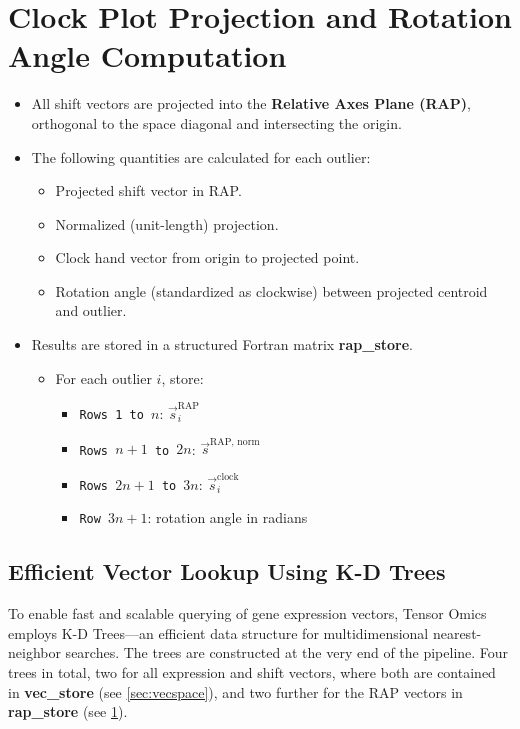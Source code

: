 \documentclass{article}
\begin{document}
\section{Clock Plot Projection and Rotation Angle Computation}
\label{sec:rap}
\begin{itemize}
    \item All shift vectors are projected into the \textbf{Relative Axes Plane
      (RAP)}, orthogonal to the space diagonal and intersecting the origin.
    \item The following quantities are calculated for each outlier:
    \begin{itemize}
        \item Projected shift vector in RAP.
        \item Normalized (unit-length) projection.
        \item Clock hand vector from origin to projected point.
        \item Rotation angle (standardized as clockwise) between projected centroid and outlier.
    \end{itemize}
  \item Results are stored in a structured Fortran matrix \textbf{rap\_store}.
    \begin{itemize}
        \item For each outlier \( i \), store:
        \begin{itemize}
            \item \texttt{Rows 1 to \( n \)}: \( \vec{s}_i^{\text{RAP}} \)
            \item \texttt{Rows \( n+1 \) to \( 2n \)}: \( \vec{s}^{\text{RAP, norm}} \)
            \item \texttt{Rows \( 2n+1 \) to \( 3n \)}: \( \vec{s}_i^{\text{clock}} \)
            \item \texttt{Row \( 3n+1 \)}: rotation angle in radians
        \end{itemize}
    \end{itemize}
\end{itemize}

\subsection{Efficient Vector Lookup Using K-D Trees}
\label{sec:kdtree}

To enable fast and scalable querying of gene expression vectors, Tensor Omics
employs K-D Trees—an efficient data structure for multidimensional
nearest-neighbor searches. The trees are constructed at the very end of the
pipeline. Four trees in total, two for all expression and shift vectors, where
both are contained in \textbf{vec\_store} (see \ref{sec:vecspace}), and two
further for the RAP vectors in \textbf{rap\_store} (see \ref{sec:rap}).
\end{document}
